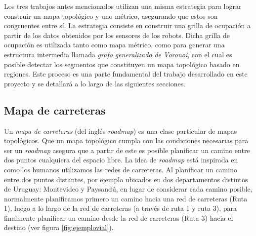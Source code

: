 Los tres trabajos antes mencionados utilizan una misma estrategia para lograr construir un mapa topológico y uno métrico, asegurando que estos son congruentes entre sí. La estrategia consiste en construir una grilla de ocupación a partir de los datos obtenidos por los sensores de los robots. Dicha grilla de ocupación es utilizada tanto como mapa métrico, como para generar una estructura intermedia llamada \emph{grafo generalizado de Voronoi}, con el cual es posible detectar los segmentos que constituyen un mapa topológico basado en regiones. Este proceso es una parte fundamental del trabajo desarrollado en este proyecto y se detallará a lo largo de las siguientes secciones.%

\subsection{Mapa de carreteras}\label{subsec:mapacarr}
Un \emph{mapa de carreteras} (del inglés \emph{roadmap}) \cite{choset2005principles} es una clase particular de mapas topológicos. Que un mapa topológico cumpla con las condiciones necesarias para ser un \emph{roadmap} asegura que a partir de este es posible planificar un camino entre dos puntos cualquiera del espacio libre. La idea de \emph{roadmap} está inspirada en como los humanos utilizamos las redes de carreteras. Al planificar un camino entre dos puntos distantes, por ejemplo ubicados en dos departamentos distintos de Uruguay: Montevideo y Paysandú, en lugar de considerar cada camino posible, normalmente planificamos primero un camino hacia una red de carreteras (Ruta 1), luego a lo largo de la red de carreteras (a través de ruta 1 y ruta 3), para finalmente planificar un camino desde la red de carreteras (Ruta 3) hacia el destino (ver figura \ref{fig:ejemplovial}). 

